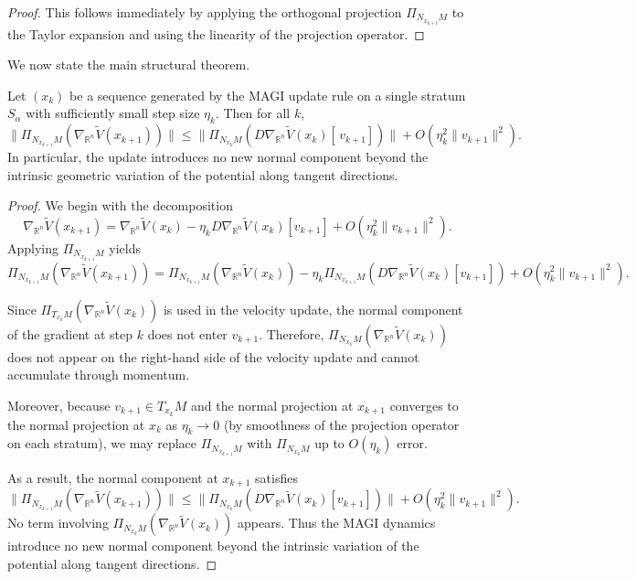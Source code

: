 \documentclass[12pt]{article}
\begin{document}
\begin{proof}
This follows immediately by applying the orthogonal projection $\Pi_{N_{x_{k+1}}M}$ to the Taylor expansion and using the linearity of the projection operator.
\end{proof}

We now state the main structural theorem.

\begin{theorem}
Let $(x_k)$ be a sequence generated by the MAGI update rule on a single stratum $S_\alpha$ with sufficiently small step size $\eta_k$. Then for all $k$,
\[
\big\| \Pi_{N_{x_{k+1}}M}(\nabla_{\mathbb{R}^n} \widetilde{V}(x_{k+1})) \big\|
\le
\big\| \Pi_{N_{x_k}M}(D\nabla_{\mathbb{R}^n} \widetilde{V}(x_k)[\, v_{k+1} ]) \big\|
+ O(\eta_k^2 \|v_{k+1}\|^2).
\]
In particular, the update introduces no new normal component beyond the intrinsic geometric variation of the potential along tangent directions.
\end{theorem}

\begin{proof}
We begin with the decomposition
\[
\nabla_{\mathbb{R}^n} \widetilde{V}(x_{k+1})
=
\nabla_{\mathbb{R}^n} \widetilde{V}(x_k)
-
\eta_k D\nabla_{\mathbb{R}^n} \widetilde{V}(x_k)[v_{k+1}]
+ O(\eta_k^2 \|v_{k+1}\|^2).
\]
Applying $\Pi_{N_{x_{k+1}}M}$ yields
\[
\Pi_{N_{x_{k+1}}M}(\nabla_{\mathbb{R}^n} \widetilde{V}(x_{k+1}))
=
\Pi_{N_{x_{k+1}}M}(\nabla_{\mathbb{R}^n} \widetilde{V}(x_k))
-
\eta_k \Pi_{N_{x_{k+1}}M}(D\nabla_{\mathbb{R}^n} \widetilde{V}(x_k)[v_{k+1}])
+
O(\eta_k^2\|v_{k+1}\|^2).
\]

Since $\Pi_{T_{x_k}M}(\nabla_{\mathbb{R}^n}\widetilde{V}(x_k))$ is used in the velocity update, the normal component of the gradient at step $k$ does not enter $v_{k+1}$. Therefore, $\Pi_{N_{x_k}M}(\nabla_{\mathbb{R}^n}\widetilde{V}(x_k))$ does not appear on the right-hand side of the velocity update and cannot accumulate through momentum.

Moreover, because $v_{k+1} \in T_{x_k}M$ and the normal projection at $x_{k+1}$ converges to the normal projection at $x_k$ as $\eta_k \to 0$ (by smoothness of the projection operator on each stratum), we may replace $\Pi_{N_{x_{k+1}}M}$ with $\Pi_{N_{x_k}M}$ up to $O(\eta_k)$ error.

As a result, the normal component at $x_{k+1}$ satisfies
\[
\big\|\Pi_{N_{x_{k+1}}M}(\nabla_{\mathbb{R}^n}\widetilde{V}(x_{k+1}))\big\|
\le
\big\|\Pi_{N_{x_k}M}(D\nabla_{\mathbb{R}^n}\widetilde{V}(x_k)[v_{k+1}])\big\|
+ O(\eta_k^2\|v_{k+1}\|^2).
\]
No term involving $\Pi_{N_{x_k}M}(\nabla_{\mathbb{R}^n}\widetilde{V}(x_k))$ appears. Thus the MAGI dynamics introduce no new normal component beyond the intrinsic variation of the potential along tangent directions.
\end{proof}
\end{document}
